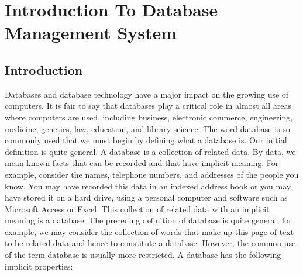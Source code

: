 \chapter{Introduction To Database Management System}

\section{Introduction}
Databases and database technology have a major impact on the growing use of computers. It is fair to say that databases play a critical role in almost all areas where computers are used, including business, electronic commerce, engineering, medicine, genetics, law, education, and library science. The word database is so commonly used that we must begin by defining what a database is. Our initial definition is quite general. A database is a collection of related data. By data, we mean known facts that can be recorded and that have implicit meaning. For example, consider the names, telephone numbers, and addresses of the people you know. You may have recorded this data in an indexed address book or you may have stored it on a hard drive, using a personal computer and software such as Microsoft Access or Excel. This collection of related data with an implicit meaning is a database. The preceding definition of database is quite general; for example, we may consider the collection of words that make up this page of text to be related data and hence to constitute a database. However, the common use of the term database is usually more restricted. 
A database has the following implicit properties:

